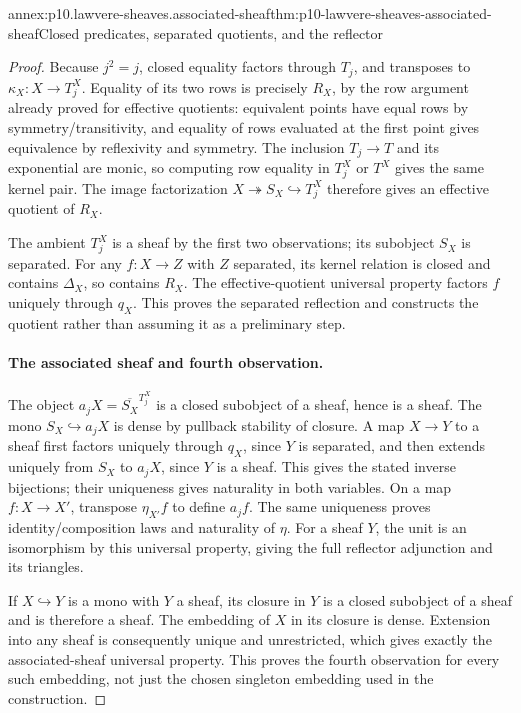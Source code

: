 \begin{annexitem}{annex:p10.lawvere-sheaves.associated-sheaf}{thm:p10-lawvere-sheaves-associated-sheaf}{Closed predicates, separated quotients, and the reflector}
\begin{proof}
Because \(j^2=j\), closed equality factors through
\(T_j\), and transposes to \(\kappa_X:X\to T_j^X\).
Equality of its two rows is precisely \(R_X\), by
the row argument already proved for effective quotients:
equivalent points have equal rows by symmetry/transitivity,
and equality of rows evaluated at the first point gives
equivalence by reflexivity and symmetry.  The inclusion
\(T_j\to T\) and its exponential are monic, so
computing row equality in \(T_j^X\) or \(T^X\)
gives the same kernel pair.  The image factorization
\(X\twoheadrightarrow S_X\hookrightarrow T_j^X\)
therefore gives an effective quotient of \(R_X\).

The ambient \(T_j^X\) is a sheaf by the first two
observations; its subobject \(S_X\) is separated.
For any \(f:X\to Z\) with \(Z\) separated, its
kernel relation is closed and contains \(\Delta_X\),
so contains \(R_X\).  The effective-quotient universal
property factors \(f\) uniquely through \(q_X\).
This proves the separated reflection and constructs the
quotient rather than assuming it as a preliminary step.

\paragraph{The associated sheaf and fourth observation.}
The object \(a_jX=\overline{S_X}^{T_j^X}\) is
a closed subobject of a sheaf, hence is a sheaf.
The mono \(S_X\hookrightarrow a_jX\) is dense by
pullback stability of closure.  A map \(X\to Y\)
to a sheaf first factors uniquely through \(q_X\),
since \(Y\) is separated, and then extends uniquely
from \(S_X\) to \(a_jX\), since \(Y\) is a
sheaf.  This gives the stated inverse bijections;
their uniqueness gives naturality in both variables.
On a map \(f:X\to X'\), transpose \(\eta_{X'}f\)
to define \(a_jf\).  The same uniqueness proves
identity/composition laws and naturality of \(\eta\).
For a sheaf \(Y\), the unit is an isomorphism by
this universal property, giving the full reflector
adjunction and its triangles.

If \(X\hookrightarrow Y\) is a mono with \(Y\)
a sheaf, its closure in \(Y\) is a closed subobject
of a sheaf and is therefore a sheaf.  The embedding
of \(X\) in its closure is dense.  Extension into
any sheaf is consequently unique and unrestricted,
which gives exactly the associated-sheaf universal
property.  This proves the fourth observation for
every such embedding, not just the chosen singleton
embedding used in the construction.


\end{proof}
\end{annexitem}

